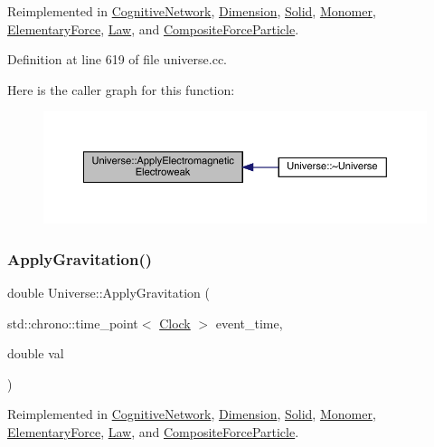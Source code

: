 Reimplemented in \hyperlink{class_cognitive_network_a9753f52c9e36ad44e9fac1d3e38a0770}{Cognitive\+Network}, \hyperlink{class_dimension_ab13e8ed50a4373274636e542c917db01}{Dimension}, \hyperlink{class_solid_a46702e3109994b310eb4f1fba5610e0b}{Solid}, \hyperlink{class_monomer_a4c3f9894ea57047789bec32602f033cb}{Monomer}, \hyperlink{class_elementary_force_a3764a27b11760b6ead2c8a23ff25d77a}{Elementary\+Force}, \hyperlink{class_law_a4485046db890a95cea16573042a4f4f6}{Law}, and \hyperlink{class_composite_force_particle_a5f6aef9e15e2e5f346c7ede76ae6458b}{Composite\+Force\+Particle}.



Definition at line 619 of file universe.\+cc.

Here is the caller graph for this function\+:
\nopagebreak
\begin{figure}[H]
\begin{center}
\leavevmode
\includegraphics[width=350pt]{class_universe_a4c36c1ab30db993307f88363dde5e8c5_icgraph}
\end{center}
\end{figure}
\mbox{\label{class_universe_a76c0b5e63c2a7d1988c44db341c3d64c}} 
\subsubsection{\texorpdfstring{Apply\+Gravitation()}{ApplyGravitation()}}
{\footnotesize\ttfamily double Universe\+::\+Apply\+Gravitation (\begin{DoxyParamCaption}\item[{std\+::chrono\+::time\+\_\+point$<$ \hyperlink{universe_8h_a0ef8d951d1ca5ab3cfaf7ab4c7a6fd80}{Clock} $>$}]{event\+\_\+time,  }\item[{double}]{val }\end{DoxyParamCaption})\hspace{0.3cm}{\ttfamily [virtual]}}



Reimplemented in \hyperlink{class_cognitive_network_a7d3252977440a9a5c004f748647ce885}{Cognitive\+Network}, \hyperlink{class_dimension_a9474b0dd3f6321a92bfe4375bb4b2266}{Dimension}, \hyperlink{class_solid_af2b3133138ce2482faa462d07aa23042}{Solid}, \hyperlink{class_monomer_a8747945cc2f7abd7ce0885345ad14ebc}{Monomer}, \hyperlink{class_elementary_force_a655a2c9489bfbbf15e05ba4953628134}{Elementary\+Force}, \hyperlink{class_law_a04efdc724335219ab0affdcffb55eea2}{Law}, and \hyperlink{class_composite_force_particle_ae26a03c2970a3825e8583a811339b28d}{Composite\+Force\+Particle}.



